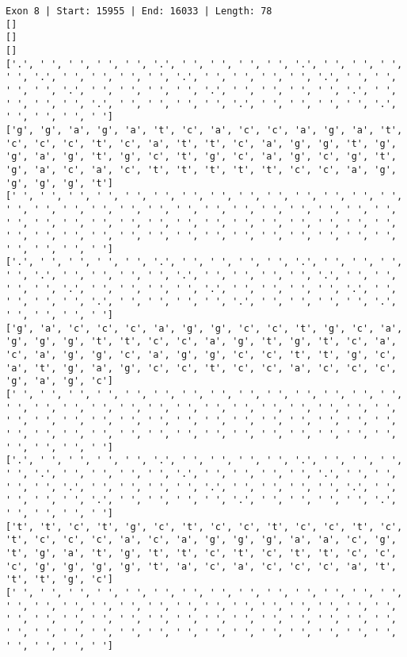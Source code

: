 \documentclass{article}
\begin{document}
\begin{Verbatim}
Exon 8 | Start: 15955 | End: 16033 | Length: 78
[]
[]
[]
['.', ' ', ' ', ' ', ' ', '.', ' ', ' ', ' ', ' ', '.', ' ', ' ', ' ', ' ', '.', ' ', ' ', ' ', ' ', '.', ' ', ' ', ' ', ' ', '.', ' ', ' ', ' ', ' ', '.', ' ', ' ', ' ', ' ', '.', ' ', ' ', ' ', ' ', '.', ' ', ' ', ' ', ' ', '.', ' ', ' ', ' ', ' ', '.', ' ', ' ', ' ', ' ', '.', ' ', ' ', ' ', ' ']
['g', 'g', 'a', 'g', 'a', 't', 'c', 'a', 'c', 'c', 'a', 'g', 'a', 't', 'c', 'c', 'c', 't', 'c', 'a', 't', 't', 'c', 'a', 'g', 'g', 't', 'g', 'g', 'a', 'g', 't', 'g', 'c', 't', 'g', 'c', 'a', 'g', 'c', 'g', 't', 'g', 'a', 'c', 'a', 'c', 't', 't', 't', 't', 't', 'c', 'c', 'a', 'g', 'g', 'g', 'g', 't']
[' ', ' ', ' ', ' ', ' ', ' ', ' ', ' ', ' ', ' ', ' ', ' ', ' ', ' ', ' ', ' ', ' ', ' ', ' ', ' ', ' ', ' ', ' ', ' ', ' ', ' ', ' ', ' ', ' ', ' ', ' ', ' ', ' ', ' ', ' ', ' ', ' ', ' ', ' ', ' ', ' ', ' ', ' ', ' ', ' ', ' ', ' ', ' ', ' ', ' ', ' ', ' ', ' ', ' ', ' ', ' ', ' ', ' ', ' ', ' ']
['.', ' ', ' ', ' ', ' ', '.', ' ', ' ', ' ', ' ', '.', ' ', ' ', ' ', ' ', '.', ' ', ' ', ' ', ' ', '.', ' ', ' ', ' ', ' ', '.', ' ', ' ', ' ', ' ', '.', ' ', ' ', ' ', ' ', '.', ' ', ' ', ' ', ' ', '.', ' ', ' ', ' ', ' ', '.', ' ', ' ', ' ', ' ', '.', ' ', ' ', ' ', ' ', '.', ' ', ' ', ' ', ' ']
['g', 'a', 'c', 'c', 'c', 'a', 'g', 'g', 'c', 'c', 't', 'g', 'c', 'a', 'g', 'g', 'g', 't', 't', 'c', 'c', 'a', 'g', 't', 'g', 't', 'c', 'a', 'c', 'a', 'g', 'g', 'c', 'a', 'g', 'g', 'c', 'c', 't', 't', 'g', 'c', 'a', 't', 'g', 'a', 'g', 'c', 'c', 't', 'c', 'c', 'a', 'c', 'c', 'c', 'g', 'a', 'g', 'c']
[' ', ' ', ' ', ' ', ' ', ' ', ' ', ' ', ' ', ' ', ' ', ' ', ' ', ' ', ' ', ' ', ' ', ' ', ' ', ' ', ' ', ' ', ' ', ' ', ' ', ' ', ' ', ' ', ' ', ' ', ' ', ' ', ' ', ' ', ' ', ' ', ' ', ' ', ' ', ' ', ' ', ' ', ' ', ' ', ' ', ' ', ' ', ' ', ' ', ' ', ' ', ' ', ' ', ' ', ' ', ' ', ' ', ' ', ' ', ' ']
['.', ' ', ' ', ' ', ' ', '.', ' ', ' ', ' ', ' ', '.', ' ', ' ', ' ', ' ', '.', ' ', ' ', ' ', ' ', '.', ' ', ' ', ' ', ' ', '.', ' ', ' ', ' ', ' ', '.', ' ', ' ', ' ', ' ', '.', ' ', ' ', ' ', ' ', '.', ' ', ' ', ' ', ' ', '.', ' ', ' ', ' ', ' ', '.', ' ', ' ', ' ', ' ', '.', ' ', ' ', ' ', ' ']
['t', 't', 'c', 't', 'g', 'c', 't', 'c', 'c', 't', 'c', 'c', 't', 'c', 't', 'c', 'c', 'c', 'a', 'c', 'a', 'g', 'g', 'g', 'a', 'a', 'c', 'g', 't', 'g', 'a', 't', 'g', 't', 't', 'c', 't', 'c', 't', 't', 'c', 'c', 'c', 'g', 'g', 'g', 'g', 't', 'a', 'c', 'a', 'c', 'c', 'c', 'a', 't', 't', 't', 'g', 'c']
[' ', ' ', ' ', ' ', ' ', ' ', ' ', ' ', ' ', ' ', ' ', ' ', ' ', ' ', ' ', ' ', ' ', ' ', ' ', ' ', ' ', ' ', ' ', ' ', ' ', ' ', ' ', ' ', ' ', ' ', ' ', ' ', ' ', ' ', ' ', ' ', ' ', ' ', ' ', ' ', ' ', ' ', ' ', ' ', ' ', ' ', ' ', ' ', ' ', ' ', ' ', ' ', ' ', ' ', ' ', ' ', ' ', ' ', ' ', ' ']

\end{Verbatim}
\end{document}
